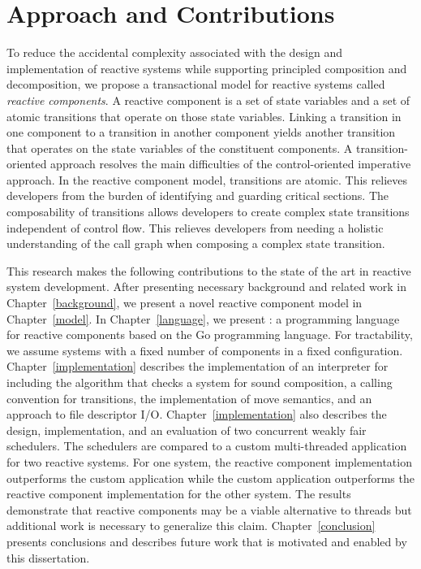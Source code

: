 \section{Approach and Contributions}

To reduce the accidental complexity associated with the design and implementation of reactive systems while supporting principled composition and decomposition, we propose a transactional model for reactive systems called \emph{reactive components}.
A reactive component is a set of state variables and a set of atomic transitions that operate on those state variables.
Linking a transition in one component to a transition in another component yields another transition that operates on the state variables of the constituent components.
A transition-oriented approach resolves the main difficulties of the control-oriented imperative approach.
In the reactive component model, transitions are atomic.
This relieves developers from the burden of identifying and guarding critical sections.
The composability of transitions allows developers to create complex state transitions independent of control flow.
This relieves developers from needing a holistic understanding of the call graph when composing a complex state transition.

This research makes the following contributions to the state of the art in reactive system development.
After presenting necessary background and related work in Chapter~\ref{background}, we present a novel reactive component model in Chapter~\ref{model}.
In Chapter~\ref{language}, we present \rcgo{}:  a programming language for reactive components based on the Go programming language.
For tractability, we assume systems with a fixed number of components in a fixed configuration.
Chapter~\ref{implementation} describes the implementation of an interpreter for \rcgo{} including the algorithm that checks a system for sound composition, a calling convention for transitions, the implementation of move semantics, and an approach to file descriptor I/O.
Chapter~\ref{implementation} also describes the design, implementation, and an evaluation of two concurrent weakly fair schedulers.
The schedulers are compared to a custom multi-threaded application for two reactive systems.
For one system, the reactive component implementation outperforms the custom application while the custom application outperforms the reactive component implementation for the other system.
The results demonstrate that reactive components may be a viable alternative to threads but additional work is necessary to generalize this claim.
Chapter~\ref{conclusion} presents conclusions and describes future work that is motivated and enabled by this dissertation.
